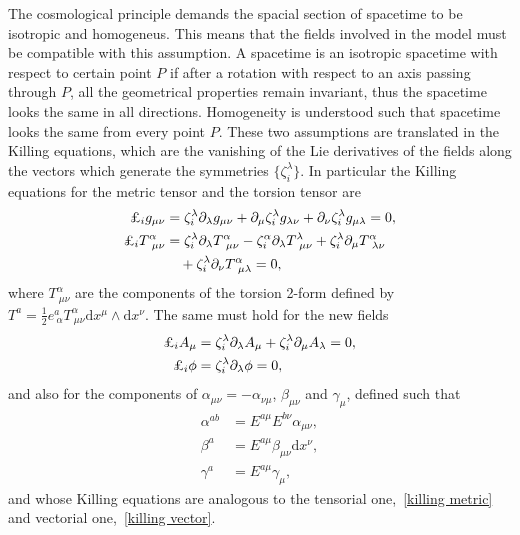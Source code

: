 \documentclass[aps,prd,12pt,superscriptaddress,showpacs,showkeys,longbibliography,reprint,nofootinbib]{revtex4-1}
\begin{document}
The cosmological principle demands the spacial section of spacetime to be isotropic and homogeneus. This means that the fields involved in the model must be compatible with this assumption. A spacetime is an isotropic spacetime with respect to certain point $P$ if after a rotation with respect to an axis passing through $P$, all the geometrical properties remain invariant, thus the spacetime looks the same in all directions. Homogeneity is understood such that spacetime looks the same from every point $P$. These two assumptions are translated in the Killing equations, which are the vanishing of the Lie derivatives of the fields along the vectors which generate the symmetries $\{\zeta^\lambda_{i}\}$. In particular the Killing equations for the metric tensor and the torsion tensor are
\begin{align}
  \label{killing metric}
  \text{\textsterling}_i g_{\mu\nu}&=\zeta^\lambda_i\partial_\lambda g_{\mu\nu}+\partial_\mu\zeta^\lambda_i g_{\lambda\nu}+\partial_\nu\zeta^\lambda_i g_{\mu\lambda}=0,\\
  \text{\textsterling}_i T^\alpha_{\ \mu\nu}&=\zeta^\lambda_i\partial_\lambda T^\alpha_{\ \mu\nu}-\zeta^\alpha_i\partial_\lambda T^\lambda_{\ \mu\nu}
  +\zeta^\lambda_i\partial_\mu T^\alpha_{\ \lambda\nu}\notag\\
  &\quad +\zeta^\lambda_i\partial_\nu T^\alpha_{\ \mu\lambda}=0,
\end{align}
where $T^\alpha_{\ \mu\nu}$ are the components of the torsion 2-form defined by $T^a=\frac{1}{2}e^a_{\ \alpha}T^\alpha_{\ \mu\nu}\mbox{d}x^\mu\wedge\mbox{d}x^\nu$. The same must hold for the new fields
\begin{align}
  \label{killing vector}
  \text{\textsterling}_i A_\mu&=\zeta^\lambda_i\partial_\lambda A_\mu+\zeta^\lambda_i\partial_\mu A_\lambda=0,\\
  \text{\textsterling}_i \phi &=\zeta^\lambda_i\partial_\lambda\phi=0,
\end{align}
and also for the components of $\alpha_{\mu\nu}=-\alpha_{\nu\mu}$, $\beta_{\mu\nu}$ and $\gamma_\mu$, defined such that
\begin{align*}
  \alpha^{ab}&=E^{a\mu}E^{b\nu}\alpha_{\mu\nu},\\
  \beta^a&=E^{a\mu}\beta_{\mu\nu}\mbox{d}x^\nu,\\
  \gamma^a&=E^{a\mu}\gamma_\mu,
\end{align*} 
and whose Killing equations are analogous to the tensorial one,~\eqref{killing metric} and vectorial one,~\eqref{killing vector}.
\end{document}

